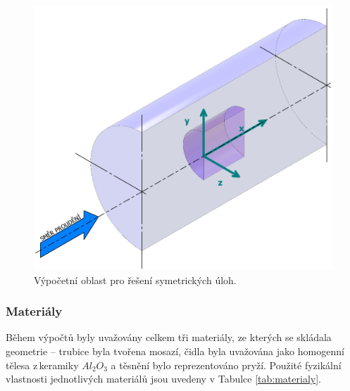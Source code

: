             \begin{figure}[ht!]
                \centering
                \includegraphics[width=\textwidth]{300_VYPOCETNI_MODEL/Vypocetni_oblast_symetrie.png}
                \caption{Výpočetní oblast pro řešení symetrických úloh.}
                \label{fig:vypocetni-oblast-symetrie}
            \end{figure}
         
	\newpage
        \subsubsection{Materiály} \label{sec:materialy}
            Během výpočtů byly uvažovány celkem tři materiály, ze kterých se skládala geometrie – trubice byla tvořena mosazí, čidla byla uvažována jako homogenní tělesa z\,keramiky $Al_2 O_3$ a těsnění bylo reprezentováno pryží. Použité fyzikální vlastnosti jednotlivých materiálů jsou uvedeny v Tabulce \ref{tab:materialy}.
            
